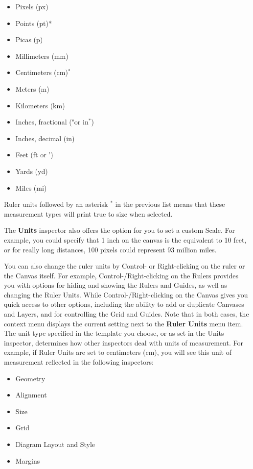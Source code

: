 \documentclass[../main.tex]{subfiles}
\begin{document}
\begin{itemize}
  \item Pixels (px)
  \item Points (pt)*
  \item Picas (p)
  \item Millimeters (mm)
  \item Centimeters (cm)$^*$
  \item Meters (m)
  \item Kilometers (km)
  \item Inches, fractional ("or in$^*$)
  \item Inches, decimal (in)
  \item Feet (ft or ')
  \item Yards (yd)
  \item Miles (mi)
\end{itemize}
Ruler units followed by an asterisk $^*$ in the previous list means that these measurement types
will print
true to size when selected.
\begin{ognote}
  The \textbf{Units} inspector also offers the option for you to set a custom Scale. For
  example, you could
  specify that 1 inch on the canvas is the equivalent to 10 feet, or for really long distances,
  100 pixels
  could represent 93 million miles.
\end{ognote}
You can also change the ruler units by Control- or Right-clicking on the ruler or the Canvas
itself. For
example, Control-/Right-clicking on the Rulers provides you with options for hiding and showing
the Rulers
and Guides, as well as changing the Ruler Units.
While Control-/Right-clicking on the Canvas gives you quick access to other options, including
the ability to
add or duplicate Canvases and Layers, and for controlling the Grid and Guides.
Note that in both cases, the context menu displays the current setting next to the \textbf{Ruler
Units} menu item.
The unit type specified in the template you choose, or as set in the Units inspector, determines
how other
inspectors deal with units of measurement. For example, if Ruler Units are set to centimeters
(cm), you will
see this unit of measurement reflected in the following inspectors:
\begin{itemize}
  \item Geometry
  \item Alignment
  \item Size
  \item Grid
  \item Diagram Layout and Style
  \item Margins
\end{itemize}
\end{document}
